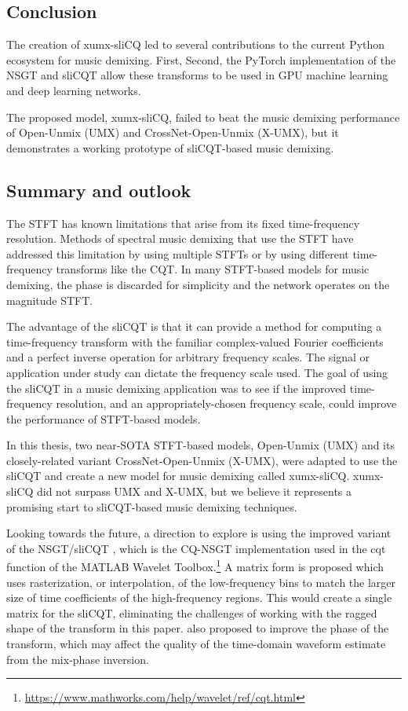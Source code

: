 \documentclass[report.tex]{subfiles}
\begin{document}
\subsection{Conclusion}
\label{sec:conclusion}


The creation of xumx-sliCQ led to several contributions to the current Python ecosystem for music demixing. First, Second, the PyTorch implementation of the NSGT and sliCQT allow these transforms to be used in GPU machine learning and deep learning networks.

The proposed model, xumx-sliCQ, failed to beat the music demixing performance of Open-Unmix (UMX) and CrossNet-Open-Unmix (X-UMX), but it demonstrates a working prototype of sliCQT-based music demixing.

\subsection{Summary and outlook}

The STFT has known limitations that arise from its fixed time-frequency resolution. Methods of spectral music demixing that use the STFT have addressed this limitation by using multiple STFTs or by using different time-frequency transforms like the CQT. In many STFT-based models for music demixing, the phase is discarded for simplicity and the network operates on the magnitude STFT.

The advantage of the sliCQT is that it can provide a method for computing a time-frequency transform with the familiar complex-valued Fourier coefficients and a perfect inverse operation for arbitrary frequency scales. The signal or application under study can dictate the frequency scale used. The goal of using the sliCQT in a music demixing application was to see if the improved time-frequency resolution, and an appropriately-chosen frequency scale, could improve the performance of STFT-based models.

In this thesis, two near-SOTA STFT-based models, Open-Unmix (UMX) and its closely-related variant CrossNet-Open-Unmix (X-UMX), were adapted to use the sliCQT and create a new model for music demixing called xumx-sliCQ. xumx-sliCQ did not surpass UMX and X-UMX, but we believe it represents a promising start to sliCQT-based music demixing techniques.

Looking towards the future, a direction to explore is using the improved variant of the NSGT/sliCQT \parencite{variableq1}, which is the CQ-NSGT implementation used in the cqt function of the MATLAB Wavelet Toolbox.\footnote{\url{https://www.mathworks.com/help/wavelet/ref/cqt.html}} A matrix form is proposed which uses rasterization, or interpolation, of the low-frequency bins to match the larger size of time coefficients of the high-frequency regions. This would create a single matrix for the sliCQT, eliminating the challenges of working with the ragged shape of the transform in this paper. \textcite{variableq1} also proposed to improve the phase of the transform, which may affect the quality of the time-domain waveform estimate from the mix-phase inversion.
\end{document}
